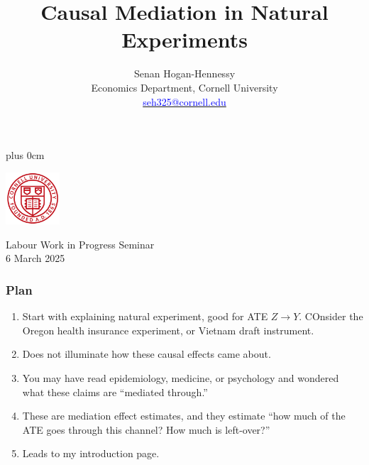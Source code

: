 \documentclass[dvipsnames,handout]{beamer} %
\title{\color{titleText}
    Causal Mediation in Natural Experiments
}
\author[Senan Hogan-Hennessy, Cornell University]{
    Senan Hogan-Hennessy \\
    Economics Department, Cornell University \\ %
    \href{mailto:seh325@cornell.edu}{\textcolor{blue}{seh325@cornell.edu}}
}
\date{} %
\renewcommand{\raggedright}{\leftskip=0pt \rightskip=0pt plus 0cm}
\begin{document}
\raggedright
\begin{frame}
    \titlepage
    \vspace{-1.5cm}
    \begin{center}
        \includegraphics[width=2cm]{presentation-files/cornell}

        \vspace{0.5cm}
        Labour Work in Progress Seminar \\
        6 March 2025
    \end{center}
\end{frame}

\begin{frame}
    \frametitle{Plan}
    \begin{enumerate}
        \item Start with explaining natural experiment, good for ATE $Z \to Y$.
        COnsider the Oregon health insurance experiment, or Vietnam draft instrument.
        \item Does not illuminate how these causal effects came about.
        \item You may have read epidemiology, medicine, or psychology and wondered what these claims are ``mediated through.''
        \item These are mediation effect estimates, and they estimate ``how much of the ATE goes through this channel?  How much is left-over?''
        \item Leads to my introduction page. 
    \end{enumerate}
\end{frame}

\end{document}
